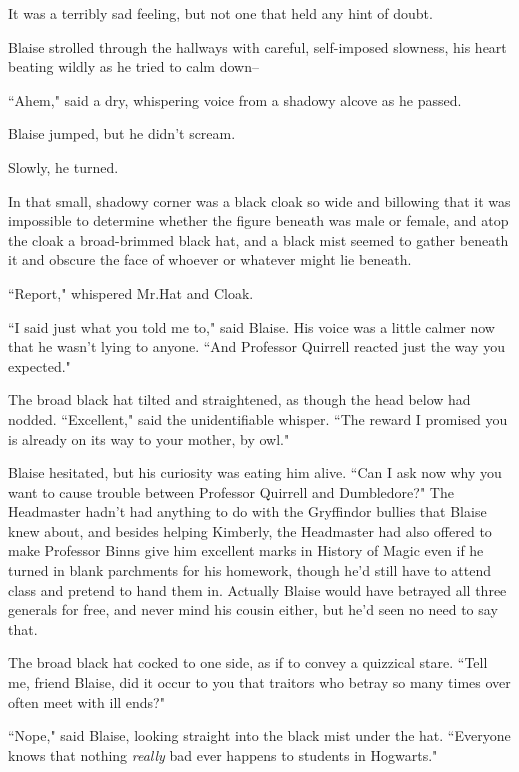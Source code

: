 It was a terribly sad feeling, but not one that held any hint of doubt.


Blaise strolled through the hallways with careful, self-imposed slowness, his heart beating wildly as he tried to calm down\---

``Ahem," said a dry, whispering voice from a shadowy alcove as he passed.

Blaise jumped, but he didn't scream.

Slowly, he turned.

In that small, shadowy corner was a black cloak so wide and billowing that it was impossible to determine whether the figure beneath was male or female, and atop the cloak a broad-brimmed black hat, and a black mist seemed to gather beneath it and obscure the face of whoever or whatever might lie beneath.

``Report," whispered Mr.\?Hat and Cloak.

``I said just what you told me to," said Blaise. His voice was a little calmer now that he wasn't lying to anyone. ``And Professor Quirrell reacted just the way you expected."

The broad black hat tilted and straightened, as though the head below had nodded. ``Excellent," said the unidentifiable whisper. ``The reward I promised you is already on its way to your mother, by owl."

Blaise hesitated, but his curiosity was eating him alive. ``Can I ask now why you want to cause trouble between Professor Quirrell and Dumbledore?" The Headmaster hadn't had anything to do with the Gryffindor bullies that Blaise knew about, and besides helping Kimberly, the Headmaster had also offered to make Professor Binns give him excellent marks in History of Magic even if he turned in blank parchments for his homework, though he'd still have to attend class and pretend to hand them in. Actually Blaise would have betrayed all three generals for free, and never mind his cousin either, but he'd seen no need to say that.

The broad black hat cocked to one side, as if to convey a quizzical stare. ``Tell me, friend Blaise, did it occur to you that traitors who betray so many times over often meet with ill ends?"

``Nope," said Blaise, looking straight into the black mist under the hat. ``Everyone knows that nothing \emph{really} bad ever happens to students in Hogwarts."

